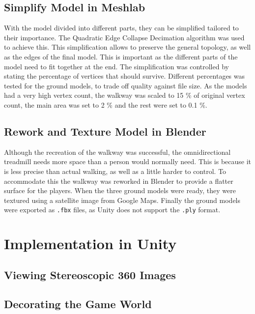     \subsection{Simplify Model in Meshlab}
        With the model divided into different parts, they can be simplified tailored to their importance. The Quadratic Edge Collapse Decimation algorithm was used to achieve this. This simplification allows to preserve the general topology, as well as the edges of the final model. This is important as the different parts of the model need to fit together at the end. The simplification was controlled by stating the percentage of vertices that should survive. Different percentages was tested for the ground models, to trade off quality against file size. As the models had a very high vertex count, the walkway was scaled to 15 \% of original vertex count, the main area was set to 2 \% and the rest were set to 0.1 \%.
        
    
    \subsection{Rework and Texture Model in Blender}
        Although the recreation of the walkway was successful, the omnidirectional treadmill needs more space than a person would normally need. This is because it is less precise than actual walking, as well as a little harder to control. To accommodate this the walkway was reworked in Blender to provide a flatter surface for the players. When the three ground models were ready, they were textured using a satellite image from Google Maps. Finally the ground models were exported as \texttt{.fbx} files, as Unity does not support the \texttt{.ply} format.
        

\section{Implementation in Unity}
    \subsection{Viewing Stereoscopic 360 Images}
    
    \subsection{Decorating the Game World}

